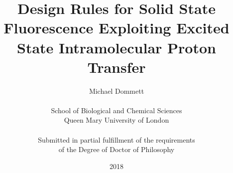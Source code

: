 \documentclass[a4paper]{report}
\begin{document}
\setlength{\TPHorizModule}{200mm} 
\setlength{\TPVertModule}{100mm} 
\textblockorigin{61mm}{19mm}






\providecommand{\OT}[1]{\operatorname{\Theta}\bigl(#1\bigr)}
\providecommand{\OOm}[1]{\operatorname{\Omega}\bigl(#1\bigr)}


\title{\huge
\textbf{Design Rules for Solid State Fluorescence Exploiting Excited State Intramolecular Proton Transfer}}
\author{Michael Dommett \\
\\
School of Biological and Chemical Sciences\\
Queen Mary University of London\\
\\
Submitted in partial fulfillment of the requirements\\ of the Degree of Doctor of Philosophy}

\date{2018}


\maketitle


  

\setcounter{page}{3}

%
%
\tableofcontents
\listoffigures
\listoftables








\appendix
\appendixpage
\setcounter{figure}{0} \renewcommand{\thefigure}{A\arabic{figure}}
\end{document}
